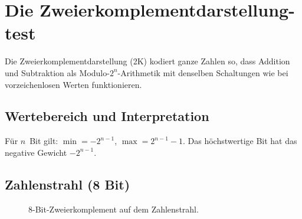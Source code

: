 \documentclass[../skript/main.tex]{subfiles}
\begin{document}
\chapter{Die Zweierkomplementdarstellung-test}
\label{chap:zweierkomplement}

Die Zweierkomplementdarstellung (2K) kodiert ganze Zahlen so, dass Addition und Subtraktion
als Modulo-\(2^n\)-Arithmetik mit denselben Schaltungen wie bei vorzeichenlosen Werten funktionieren.

\section{Wertebereich und Interpretation}
Für \(n\)~Bit gilt: \(\min=-2^{n-1}\), \(\max=2^{n-1}-1\).
Das höchstwertige Bit hat das negative Gewicht \(-2^{n-1}\).

\section{Zahlenstrahl (8 Bit)}
\begin{figure}[H]\centering
{}
\caption{8-Bit-Zweierkomplement auf dem Zahlenstrahl.}
\end{figure}
\end{document}
